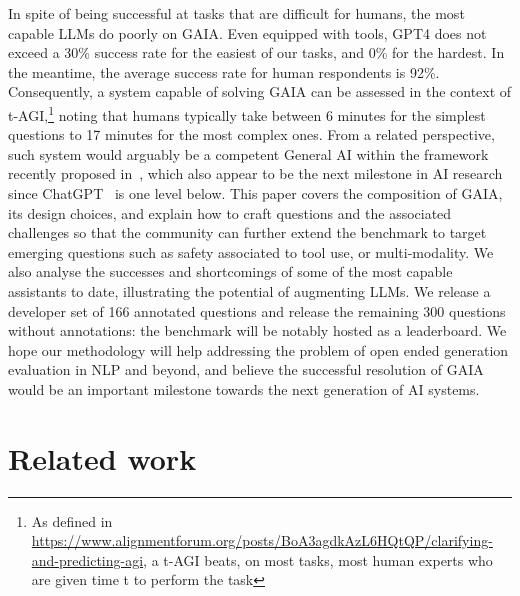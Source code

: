 \documentclass{fairmeta}
\newcommand{\benchmark}{\textsc{GAIA}}
\newcommand{\test}{300}
\newcommand{\dev}{166}
\newcommand{\humanscore}{92\%}
\begin{document}
In spite of being successful at tasks that are difficult for humans, the most capable LLMs do poorly on \benchmark{}. Even equipped with tools, GPT4 does not exceed a 30\% success rate for the easiest of our tasks, and 0\% for the hardest.
In the meantime, the average success rate for human respondents is \humanscore{}. Consequently, a system capable of solving \benchmark{} can be assessed in the context of t-AGI,\footnote{As defined in \url{https://www.alignmentforum.org/posts/BoA3agdkAzL6HQtQP/clarifying-and-predicting-agi}, a t-AGI beats, on most tasks, most human experts who are given time t to perform the task} noting that humans typically take between 6 minutes for the simplest questions to 17 minutes for the most complex ones. From a related perspective, such system would arguably be a competent General AI within the framework recently proposed in~\citet{morris2023levels}, which also appear to be the next milestone in AI research since ChatGPT~\citep{openai2023gpt4} is one level below.
This paper covers the composition of \benchmark{}, its design choices, and explain how to craft questions and the associated challenges so that the community can further extend the benchmark to target emerging questions such as safety associated to tool use, or multi-modality.
We also analyse the successes and shortcomings of some of the most capable assistants to date, illustrating the potential of augmenting LLMs.
We release a developer set of \dev{} annotated questions
and release the remaining \test{} questions without annotations: the benchmark will be notably hosted as a leaderboard.
We hope our methodology will help addressing the problem of open ended generation evaluation in NLP and beyond, and believe the successful resolution of \benchmark{} would be an important milestone towards the next generation of AI systems.

\section{Related work}
\end{document}
